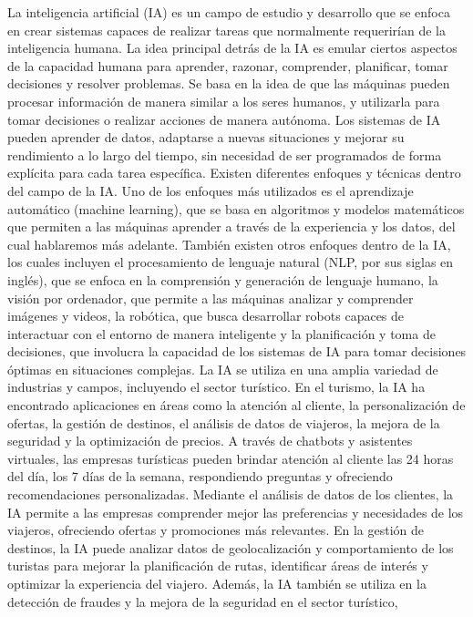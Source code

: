 \documentclass[
  letterpaper,
  DIV=11,
  numbers=noendperiod]{scrreprt}
\begin{document}
La inteligencia artificial (IA) es un campo de estudio y desarrollo que
se enfoca en crear sistemas capaces de realizar tareas que normalmente
requerirían de la inteligencia humana. La idea principal detrás de la IA
es emular ciertos aspectos de la capacidad humana para aprender,
razonar, comprender, planificar, tomar decisiones y resolver problemas.
Se basa en la idea de que las máquinas pueden procesar información de
manera similar a los seres humanos, y utilizarla para tomar decisiones o
realizar acciones de manera autónoma. Los sistemas de IA pueden aprender
de datos, adaptarse a nuevas situaciones y mejorar su rendimiento a lo
largo del tiempo, sin necesidad de ser programados de forma explícita
para cada tarea específica. Existen diferentes enfoques y técnicas
dentro del campo de la IA. Uno de los enfoques más utilizados es el
aprendizaje automático (machine learning), que se basa en algoritmos y
modelos matemáticos que permiten a las máquinas aprender a través de la
experiencia y los datos, del cual hablaremos más adelante. También
existen otros enfoques dentro de la IA, los cuales incluyen el
procesamiento de lenguaje natural (NLP, por sus siglas en inglés), que
se enfoca en la comprensión y generación de lenguaje humano, la visión
por ordenador, que permite a las máquinas analizar y comprender imágenes
y videos, la robótica, que busca desarrollar robots capaces de
interactuar con el entorno de manera inteligente y la planificación y
toma de decisiones, que involucra la capacidad de los sistemas de IA
para tomar decisiones óptimas en situaciones complejas. La IA se utiliza
en una amplia variedad de industrias y campos, incluyendo el sector
turístico. En el turismo, la IA ha encontrado aplicaciones en áreas como
la atención al cliente, la personalización de ofertas, la gestión de
destinos, el análisis de datos de viajeros, la mejora de la seguridad y
la optimización de precios. A través de chatbots y asistentes virtuales,
las empresas turísticas pueden brindar atención al cliente las 24 horas
del día, los 7 días de la semana, respondiendo preguntas y ofreciendo
recomendaciones personalizadas. Mediante el análisis de datos de los
clientes, la IA permite a las empresas comprender mejor las preferencias
y necesidades de los viajeros, ofreciendo ofertas y promociones más
relevantes. En la gestión de destinos, la IA puede analizar datos de
geolocalización y comportamiento de los turistas para mejorar la
planificación de rutas, identificar áreas de interés y optimizar la
experiencia del viajero. Además, la IA también se utiliza en la
detección de fraudes y la mejora de la seguridad en el sector turístico,
\end{document}
